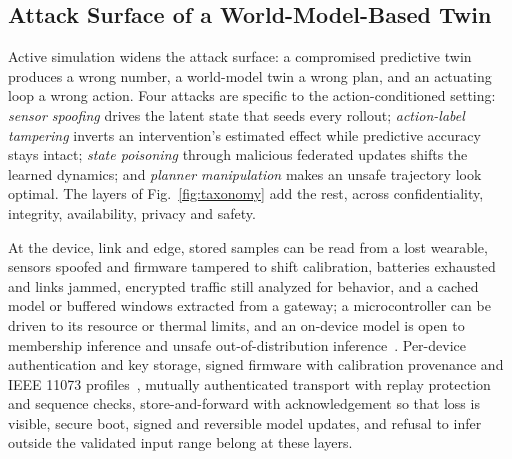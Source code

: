 \documentclass[journal]{IEEEtran}
\begin{document}
\subsection{Attack Surface of a World-Model-Based Twin}
\label{sec:attack}
Active simulation widens the attack surface: a compromised predictive twin produces a wrong number, a world-model twin a wrong plan, and an actuating loop a wrong action. Four attacks are specific to the action-conditioned setting: \emph{sensor spoofing} drives the latent state that seeds every rollout; \emph{action-label tampering} inverts an intervention's estimated effect while predictive accuracy stays intact; \emph{state poisoning} through malicious federated updates shifts the learned dynamics; and \emph{planner manipulation} makes an unsafe trajectory look optimal. The layers of Fig.~\ref{fig:taxonomy} add the rest, across confidentiality, integrity, availability, privacy and safety.

At the device, link and edge, stored samples can be read from a lost wearable, sensors spoofed and firmware tampered to shift calibration, batteries exhausted and links jammed, encrypted traffic still analyzed for behavior, and a cached model or buffered windows extracted from a gateway; a microcontroller can be driven to its resource or thermal limits, and an on-device model is open to membership inference and unsafe out-of-distribution inference~\cite{saha2022mcuml}. Per-device authentication and key storage, signed firmware with calibration provenance and IEEE 11073 profiles~\cite{ieee11073std}, mutually authenticated transport with replay protection and sequence checks, store-and-forward with acknowledgement so that loss is visible, secure boot, signed and reversible model updates, and refusal to infer outside the validated input range belong at these layers.
\end{document}
